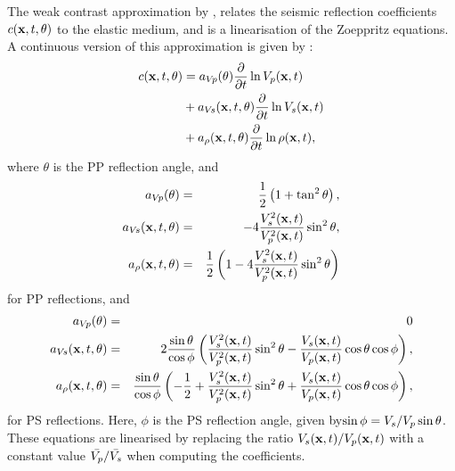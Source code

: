 The weak contrast approximation by \cite{aki80},
relates the seismic reflection coefficients $c(\mathbf{x},t,\theta)$
to the elastic medium, and is a linearisation of the Zoeppritz
equations. A continuous version of this approximation is given by \cite{stolt85}:
%
\begin{equation}
\begin{split}
\label{eq:aki_c}
  c(\mathbf{x},t,\theta)
  & = a_{V\!p} (\theta) \frac{\partial}{\partial t}\ln V_p (\mathbf{x},t)\\
  & + a_{V\!s} (\mathbf{x},t,\theta) \frac{\partial}{\partial t}\ln V_s (\mathbf{x},t)\\
  & + a_\rho(\mathbf{x},t,\theta) \frac{\partial}{\partial t}\ln\rho(\mathbf{x},t),
\end{split}
\end{equation}
%
where $\theta$ is the PP reflection angle, and
%
\begin{eqnarray}
  a_{V\!p} (\theta)            &=& \frac{1}{2}\left(1 + \tan^2\theta\right), \nonumber \\
  a_{V\!s} (\mathbf{x},t,\theta) &=& -4 \frac{V_s^2(\mathbf{x},t)}
                                         {V_p^2(\mathbf{x},t)}\sin^2\theta, \label{a_coef_pp}\\
  a_\rho(\mathbf{x},t,\theta)    &=& \frac{1}{2}\left(1
                                   -4\frac{V_s^2(\mathbf{x},t)}{V_p^2(\mathbf{x},t)}
                                        \sin^2\theta\right)\nonumber
\end{eqnarray}
%
for PP reflections, and
\begin{eqnarray}
  a_{V\!p} (\theta)            &=& 0 \nonumber \\
  a_{V\!s} (\mathbf{x},t,\theta) &=& 2 \frac{\sin\theta}{\cos\phi}\left(\frac{V_s^2(\mathbf{x},t)}
                                         {V_p^2(\mathbf{x},t)}\sin^2\theta - \frac{V_s(\mathbf{x},t)}{V_p(\mathbf{x},t)}\cos\theta\cos\phi\right)
                                         , \label{a_coef_ps}\\
  a_\rho(\mathbf{x},t,\theta)    &=& \frac{\sin\theta}{\cos\phi}\left(-\frac{1}{2}+\frac{V_s^2(\mathbf{x},t)}
                                         {V_p^2(\mathbf{x},t)}\sin^2\theta + \frac{V_s(\mathbf{x},t)}{V_p(\mathbf{x},t)}\cos\theta\cos\phi\right)
                                         , \nonumber
\end{eqnarray}
for PS reflections. Here, $\phi$ is the PS reflection angle, given by$\sin\phi = V_s/V_p\sin\theta$.
These equations are linearised by replacing the ratio
$V_s(\mathbf{x},t)/V_p(\mathbf{x},t)$ with a constant value
$\bar{V_p}/\bar{V_s}$ when computing the coefficients.

